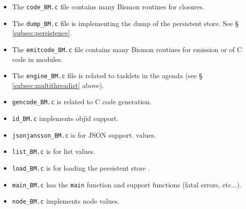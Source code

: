 \begin{appendices}
\begin{itemize}
  \item The \texttt{code\_BM.c} file contains many Bismon routines for
           
     closures.

  \item The \texttt{dump\_BM.c} file is implementing the  dump of the
    persistent store.   See \S
      \ref{subsec:persistence}.

  \item The \texttt{emitcode\_BM.c} file contains many Bismon routines
    for  emission or  of C code in
     modules.

  \item The \texttt{engine\_BM.c} file is related to  tasklets 
     in the agenda (see \S
    \ref{subsec:multithreadist} above).

  \item \texttt{gencode\_BM.c} is related
     to C code
    generation.  

  \item \texttt{id\_BM.c} implements objid 
     support.

  \item \texttt{jsonjansson\_BM.c} is for JSON 
     support.
    values.

  \item \texttt{list\_BM.c} is for list 
      values.

  \item \texttt{load\_BM.c} is for loading the persistent store
   .

  \item \texttt{main\_BM.c} has the \texttt{main} function 
     and support functions (fatal errors, etc...).

  \item \texttt{node\_BM.c} implements node values. 


\end{itemize}
\end{appendices}
